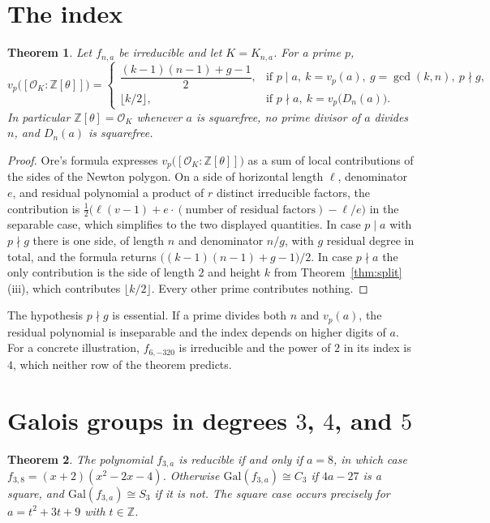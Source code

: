 \documentclass[11pt]{article}
\newtheorem{theorem}{Theorem}
\theoremstyle{definition}
\theoremstyle{remark}
\newcommand{\Z}{\mathbb{Z}}
\newcommand{\OK}{\mathcal{O}_K}
\newcommand{\Gal}{\mathrm{Gal}}
\begin{document}
\section{The index}\label{sec:index}

\begin{theorem}\label{thm:index}
Let $f_{n,a}$ be irreducible and let $K=K_{n,a}$. For a prime $p$,
\[
v_p\bigl([\OK:\Z[\theta]]\bigr)=
\begin{cases}
\dfrac{(k-1)(n-1)+g-1}{2},
  & \text{if }p\mid a,\ k=v_p(a),\ g=\gcd(k,n),\ p\nmid g,\\[4pt]
\lfloor k/2\rfloor,
  & \text{if }p\nmid a,\ k=v_p\bigl(D_n(a)\bigr).
\end{cases}
\]
In particular $\Z[\theta]=\OK$ whenever $a$ is squarefree, no prime divisor of $a$
divides $n$, and $D_n(a)$ is squarefree.
\end{theorem}

\begin{proof}
Ore's formula expresses $v_p\bigl([\OK:\Z[\theta]]\bigr)$ as a sum of local
contributions of the sides of the Newton polygon. On a side of horizontal length
$\ell$, denominator $e$, and residual polynomial a product of $r$ distinct
irreducible factors, the contribution is
$\tfrac12\bigl(\ell(v-1)+e\cdot(\text{number of residual factors})-\ell/e\bigr)$
in the separable case, which simplifies to the two displayed quantities. In
case $p\mid a$ with $p\nmid g$ there is one side, of length $n$ and denominator
$n/g$, with $g$ residual degree in total, and the formula returns
$\bigl((k-1)(n-1)+g-1\bigr)/2$. In case $p\nmid a$ the only contribution is the
side of length $2$ and height $k$ from Theorem~\ref{thm:split}(iii), which
contributes $\lfloor k/2\rfloor$. Every other prime contributes nothing.
\end{proof}

The hypothesis $p\nmid g$ is essential. If a prime divides both $n$ and
$v_p(a)$, the residual polynomial is inseparable and the index depends on higher
digits of $a$. For a concrete illustration, $f_{6,-320}$ is irreducible and the
power of $2$ in its index is $4$, which neither row of the theorem predicts.

\section{Galois groups in degrees $3$, $4$, and $5$}\label{sec:gal}

\begin{theorem}\label{thm:gal3}
The polynomial $f_{3,a}$ is reducible if and only if $a=8$, in which case
$f_{3,8}=(x+2)(x^{2}-2x-4)$. Otherwise $\Gal(f_{3,a})\cong C_3$ if $4a-27$ is a
square, and $\Gal(f_{3,a})\cong S_3$ if it is not. The square case occurs
precisely for $a=t^{2}+3t+9$ with $t\in\Z$.
\end{theorem}
\end{document}

